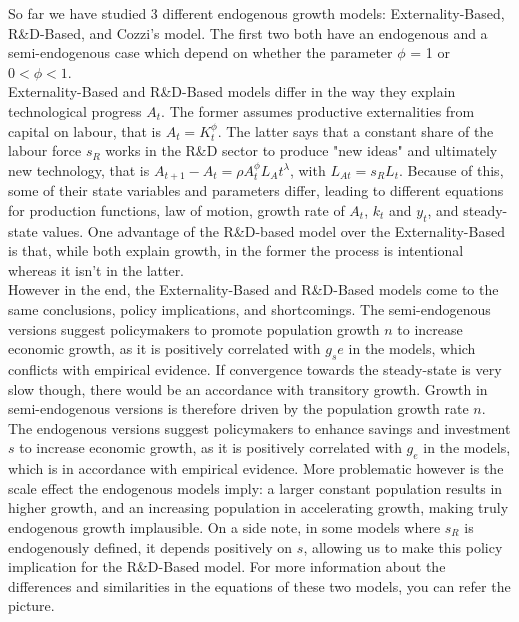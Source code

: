 \documentclass[11pt]{article} %
\begin{document}
So far we have studied 3 different endogenous growth models: Externality-Based, R\&D-Based, and Cozzi's model. The first two both have an endogenous and a semi-endogenous case which depend on whether the parameter $\phi$ = 1 or $0 < \phi < 1$.\\ Externality-Based and R\&D-Based models differ in the way they explain technological progress $A_t$. The former assumes productive externalities from capital on labour, that is $A_t = K_t^\phi$. The latter says that a constant share of the labour force $s_R$ works in the R\&D sector to produce "new ideas" and ultimately new technology, that is $A_{t+1} - A_t = \rho A_t^{\phi}L_At^\lambda$, with $L_{At} = s_{R}L_t$. Because of this, some of their state variables and parameters differ, leading to different equations for production functions, law of motion, growth rate of $A_t$, $k_t$ and $y_t$, and steady-state values. One advantage of the R\&D-based model over the Externality-Based is that, while both explain growth, in the former the process is intentional whereas it isn't in the latter.  \\
However in the end, the Externality-Based and R\&D-Based models come to the same conclusions, policy implications, and shortcomings. The semi-endogenous versions suggest policymakers to promote population growth $n$ to increase economic growth, as it is positively correlated with $g_se$ in the models, which conflicts with empirical evidence. If convergence towards the steady-state is very slow though, there would be an accordance with transitory growth. Growth in semi-endogenous versions is therefore driven by the population growth rate $n$. The endogenous versions suggest policymakers to enhance savings and investment $s$ to increase economic growth, as it is positively correlated with $g_e$ in the models, which is in accordance with empirical evidence. More problematic however is the scale effect the endogenous models imply: a larger constant population results in higher growth, and an increasing population in accelerating growth, making truly endogenous growth implausible. On a side note, in some models where $s_R$ is endogenously defined, it depends positively on $s$, allowing us to make this policy implication for the R\&D-Based model. For more information about the differences and similarities in the equations of these two models, you can refer the picture.
\end{document}
